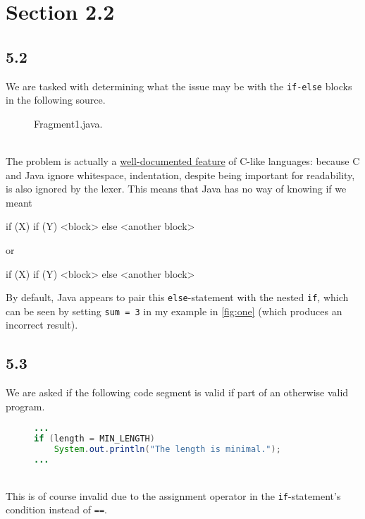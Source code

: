 \documentclass[leqno, 11pt]{article}
\begin{document}
\section*{Section 2.2}
\subsection*{5.2}
We are tasked with determining what the issue may be with the \texttt{if-else} blocks in the following source.
\begin{figure}[h!]
  \centering
  
  \caption{Fragment1.java.}
  \label{fig:one}
\end{figure}\\
The problem is actually a \href{https://stackoverflow.com/a/2125207/3928184}{well-documented feature} of C-like languages: because C and Java ignore whitespace, indentation, despite being important for readability, is also ignored by the lexer. This means that Java has no way of knowing if we meant
\begin{verbbox}
if (X)
    if (Y)
        <block>
else
    <another block>
\end{verbbox}
\begin{center}
  \theverbbox
\end{center}
or
\begin{verbbox}
if (X)
    if (Y)
        <block>
    else
        <another block>
\end{verbbox}
\begin{center}
  \theverbbox
\end{center}
By default, Java appears to pair this \texttt{else}-statement with the nested \texttt{if}, which can be seen by setting \texttt{sum = 3} in my example in \autoref{fig:one} (which produces an incorrect result).
\subsection*{5.3}
We are asked if the following code segment is valid if part of an otherwise valid program.
\begin{figure}[h!]
  \centering
  \begin{lstlisting}[language=java, xleftmargin=0.25\textwidth]
...
if (length = MIN_LENGTH)
    System.out.println("The length is minimal.");
...
  \end{lstlisting}
  \label{fig:two}
\end{figure}\\
This is of course invalid due to the assignment operator in the \texttt{if}-statement's condition instead of \texttt{==}.
\end{document}
